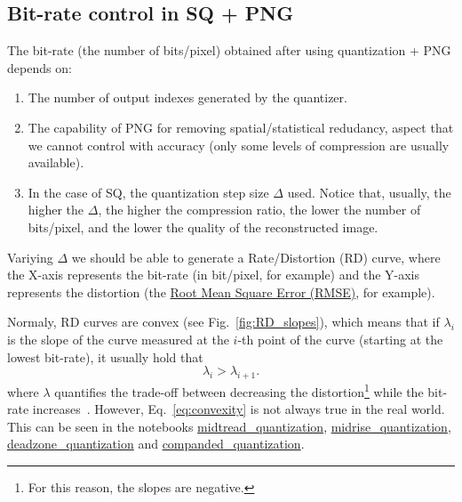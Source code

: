 
\subsection{Bit-rate control in SQ + PNG}

The bit-rate (the number of bits/pixel) obtained after using
quantization + PNG depends on:
\begin{enumerate}
\item The number of output indexes generated by the quantizer.
\item The capability of PNG for removing spatial/statistical
  redudancy, aspect that we cannot control with accuracy (only some
  levels of compression are usually available).
\item In the case of SQ, the quantization step size $\Delta$
  used. Notice that, usually, the higher the $\Delta$, the higher the
  compression ratio, the lower the number of bits/pixel, and the lower
  the quality of the reconstructed image.
\end{enumerate}
Variying $\Delta$ we should be able to generate a Rate/Distortion (RD)
curve, where the X-axis represents the bit-rate (in bit/pixel, for
example) and the Y-axis represents the distortion (the
\href{https://en.wikipedia.org/wiki/Root-mean-square_deviation}{Root
  Mean Square Error (RMSE)}, for example).

Normaly, RD curves are convex (see Fig.~\ref{fig:RD_slopes}), which
means that if $\lambda_i$ is the slope of the curve measured at the
$i$-th point of the curve (starting at the lowest bit-rate), it
usually hold that
\begin{equation}
  \lambda_i > \lambda_{i+1}.
  \label{eq:convexity}
\end{equation}
where $\lambda$ quantifies the trade-off between decreasing the
distortion\footnote{For this reason, the slopes are negative.} while
the bit-rate
increases~\cite{vetterli1995wavelets,sayood2017introduction}. However,
Eq.~\ref{eq:convexity} is not always true in the real world. This can
be seen in the notebooks
\href{https://github.com/Sistemas-Multimedia/Sistemas-Multimedia.github.io/blob/master/contents/scalar_quantization/midtread.ipynb}{midtread\_quantization},
\href{https://github.com/Sistemas-Multimedia/Sistemas-Multimedia.github.io/blob/master/contents/scalar_quantization/midrise.ipynb}{midrise\_quantization},
\href{https://github.com/Sistemas-Multimedia/Sistemas-Multimedia.github.io/blob/master/contents/scalar_quantization/deadzone.ipynb}{deadzone\_quantization}
and
\href{https://github.com/Sistemas-Multimedia/Sistemas-Multimedia.github.io/blob/master/contents/scalar_quantization/companded.ipynb}{companded\_quantization}.

